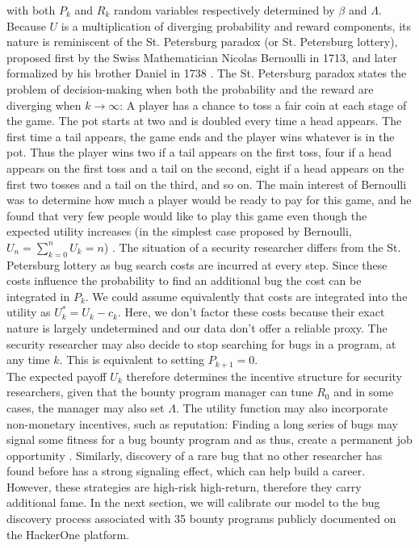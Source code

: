 \noindent with both $P_k$ and $R_k$ random variables respectively determined by $\beta$ and $\Lambda$. Because $U$ is a multiplication of diverging probability and reward components, its nature is reminiscent of the St. Petersburg paradox (or St. Petersburg lottery), proposed first by the Swiss Mathematician Nicolas Bernoulli in 1713, and later formalized by his brother Daniel in 1738 \cite{bernoulli1954exposition}.  The St. Petersburg paradox states the problem of decision-making when both the probability and the reward are diverging when $k \rightarrow \infty$: A player has a chance to toss a fair coin at each stage of the game. The pot starts at two and is doubled every time a head appears. The first time a tail appears, the game ends and the player wins whatever is in the pot. Thus the player wins two if a tail appears on the first toss, four if a head appears on the first toss and a tail on the second, eight if a head appears on the first two tosses and a tail on the third, and so on. The main interest of Bernoulli was to determine how much a player would be ready to pay for this game, and he found that very few people would like to play this game even though the expected utility increases (in the simplest case proposed by Bernoulli, $U_n = \sum_{k=0}^{n} U_k = n$) \cite{bernoulli1954exposition}. The situation of a security researcher differs from the St. Petersburg lottery as bug search costs are incurred at every step. Since these costs influence the probability to find an additional bug the cost can be integrated in $P_k$. We could assume equivalently that costs are integrated into the utility as $U^{*}_k = U_k - c_k$. Here, we don't factor these costs because their exact nature is largely undetermined and our data don't offer a reliable proxy. The security researcher may also decide to stop searching for bugs in a program, at any time $k$. This is equivalent to setting $P_{k+1} = 0$.\\

The expected payoff $U_k$ therefore determines the incentive structure for security researchers, given that the bounty program manager can tune $R_0$ and in some cases, the manager may also set $\Lambda$. The utility function may also incorporate non-monetary incentives, such as reputation: Finding a long series of bugs may signal some fitness for a bug bounty program and as thus, create a permanent job opportunity \cite{moussouris2016}. Similarly, discovery of a rare bug that no other researcher has found before has a strong signaling effect, which can help build a career. However, these strategies are high-risk high-return, therefore they carry additional fame. In the next section, we will calibrate our model to the bug discovery process associated with 35 bounty programs publicly documented on the HackerOne platform.

